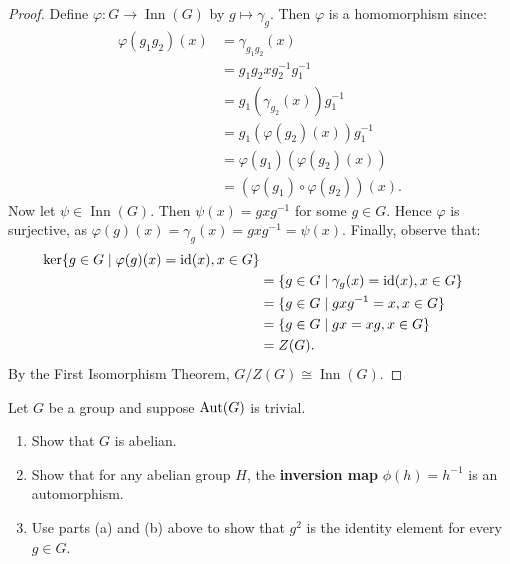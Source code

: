 \documentclass[10pt,twoside,openany]{memoir}
\begin{document}
    {\color{blue} \begin{proof}
        Define $\varphi:G \rightarrow \operatorname{Inn}(G)$ by $g \mapsto \gamma_g$. Then $\varphi$ is a homomorphism since:
            \begin{equation*}
            \begin{split}
                \varphi(g_1g_2)(x)
                & = \gamma_{g_1g_2}(x) \\
                & = g_1g_2xg_2^{-1}g_1^{-1} \\
                & = g_1(\gamma_{g_2}(x))g_1^{-1} \\
                & = g_1(\varphi(g_2)(x))g_1^{-1} \\
                & = \varphi(g_1)(\varphi(g_2)(x)) \\
                & = (\varphi(g_1) \circ \varphi(g_2))(x).
            \end{split}
            \end{equation*}
        Now let $\psi \in \operatorname{Inn}(G)$. Then $\psi(x) = gxg^{-1}$ for some $g \in G$. Hence $\varphi$ is surjective, as $\varphi(g)(x) = \gamma_g(x) = gxg^{-1} = \psi(x)$. Finally, observe that:
            \begin{equation*}
            \begin{split}
                \ker\{g \in G \mid \varphi(g)(x) = \operatorname{id}(x), x \in G\} \\
                & = \{g \in G \mid \gamma_g(x) = \operatorname{id}(x), x \in G\} \\
                & = \{g \in G \mid gxg^{-1} = x, x \in G \} \\
                & = \{g \in G \mid gx = xg, x \in G\} \\
                & = Z(G).
            \end{split}
            \end{equation*}
        By the First Isomorphism Theorem, $G/Z(G) \cong \operatorname{Inn}(G)$.
    \end{proof}}
\begin{problem}[W19, P3]
    Let $G$ be a group and suppose $\operatorname{Aut}(G)$ is trivial.
    \begin{enumerate}[label = (\alph*),itemsep=1pt,topsep=3pt]
        \item Show that $G$ is abelian.
        \item Show that for any abelian group $H$, the \textbf{inversion map} $\phi(h) = h^{-1}$ is an automorphism.
        \item Use parts (a) and (b) above to show that $g^2$ is the identity element for every $g \in G$.
    \end{enumerate}
\end{problem}
\end{document}

